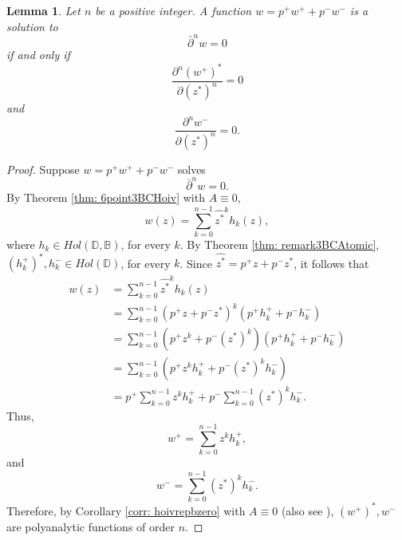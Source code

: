 \documentclass[12pt,reqno]{amsart}
\newtheorem{lem}[theorem]{Lemma}
\theoremstyle{definition}
\theoremstyle{remark}
\newcommand{\p}{\partial}
\newcommand{\dbar}{\bar\partial}
\newcommand{\bc}{\mathbb{B}}
\newcommand{\disk}{\mathbb{D}}
\begin{document}
            \begin{lem}\label{lem: bicomplexpolyanalyticidempotentrep}
                Let $n$ be a positive integer. A function $w = p^+ w^+ + p^- w^-$ is a solution to
                \[
                    \dbar^n w = 0
                \]
                if and only if 
                \[
                    \frac{\p^n (w^+)^*}{\p (z^*)^n} = 0
                \]
                and 
                \[
                    \frac{\p^n w^-}{\p (z^*)^n} = 0.
                \]
            \end{lem}

            \begin{proof}
                Suppose $w= p^+ w^+ + p^- w^-$ solves
                \[
                    \dbar^n w = 0.
                \]
                By Theorem \ref{thm: 6point3BCHoiv} with $A \equiv 0$,
                \[
                    w(z) = \sum_{k=0}^{n-1} \widehat{z^*}^k h_k(z),
                \]
                where $h_k \in Hol(\disk,\bc)$, for every $k$. By Theorem \ref{thm: remark3BCAtomic}, $(h_k^+)^*, h_k^- \in Hol(\disk)$, for every $k$. Since $\widehat{z^*} = p^+ z + p^- z^*$, it follows that 
                \begin{align*}
                     w(z) &= \sum_{k=0}^{n-1} \widehat{z^*}^k h_k(z)\\
                     &= \sum_{k=0}^{n-1} (p^+ z + p^- z^*)^k (p^+ h_k^+ + p^- h_k^-) \\
                     &= \sum_{k=0}^{n-1} (p^+ z^k + p^- (z^*)^k) (p^+ h_k^+ + p^- h_k^-) \\
                     &= \sum_{k=0}^{n-1} \left(p^+ z^k h_k^+ + p^- (z^*)^k h_k^-\right) \\
                     &= p^+ \sum_{k=0}^{n-1} z^k h_k^+ + p^- \sum_{k=0}^{n-1} (z^*)^k h_k^-.
                \end{align*}
                Thus, 
                \[
                    w^+ = \sum_{k=0}^{n-1} z^k h_k^+ ,
                \]
                and
                \[
                    w^- = \sum_{k=0}^{n-1} (z^*)^k h_k^-.
                \]
                Therefore, by Corollary \ref{corr: hoivrepbzero} with $A \equiv 0$ (also see \cite{Balk}), $(w^+)^*, w^-$ are polyanalytic functions of order $n$. 


\end{proof}
\end{document}
